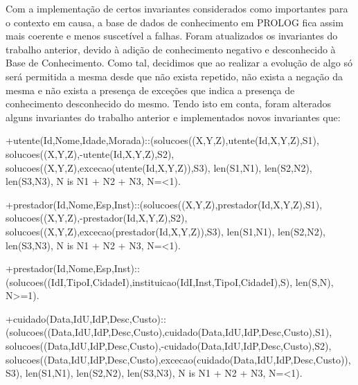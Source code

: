 \documentclass{article}
\begin{document}
Com a implementação de certos invariantes considerados como importantes para o contexto em causa, a base de dados de conhecimento em PROLOG fica assim mais coerente e menos suscetível a falhas. Foram atualizados os invariantes do trabalho anterior, devido à adição de conhecimento negativo e desconhecido à Base de Conhecimento. Como tal, decidimos que ao realizar a evolução de algo só será permitida a mesma desde que não exista repetido, não exista a negação da mesma e não exista a presença de exceções que indica a presença de conhecimento desconhecido do mesmo.
Tendo isto em conta, foram alterados alguns invariantes do trabalho anterior e implementados novos invariantes que:
\begin{spverbatim}
+utente(Id,Nome,Idade,Morada)::(solucoes((X,Y,Z),utente(Id,X,Y,Z),S1),
                                solucoes((X,Y,Z),-utente(Id,X,Y,Z),S2),
                                solucoes((X,Y,Z),excecao(utente(Id,X,Y,Z)),S3),
                                len(S1,N1),
                                len(S2,N2),
                                len(S3,N3),
                                N is N1 + N2 + N3,
                                N=<1).

+prestador(Id,Nome,Esp,Inst)::(solucoes((X,Y,Z),prestador(Id,X,Y,Z),S1),
                               solucoes((X,Y,Z),-prestador(Id,X,Y,Z),S2),
                               solucoes((X,Y,Z),excecao(prestador(Id,X,Y,Z)),S3),
                               len(S1,N1),
                               len(S2,N2),
                               len(S3,N3),
                               N is N1 + N2 + N3,
                               N=<1).

+prestador(Id,Nome,Esp,Inst)::
            (solucoes((IdI,TipoI,CidadeI),instituicao(IdI,Inst,TipoI,CidadeI),S),
            len(S,N),
            N>=1).

+cuidado(Data,IdU,IdP,Desc,Custo)::
        (solucoes((Data,IdU,IdP,Desc,Custo),cuidado(Data,IdU,IdP,Desc,Custo),S1),
        solucoes((Data,IdU,IdP,Desc,Custo),-cuidado(Data,IdU,IdP,Desc,Custo),S2),
        solucoes((Data,IdU,IdP,Desc,Custo),excecao(cuidado(Data,IdU,IdP,Desc,Custo)),S3),
        len(S1,N1),
        len(S2,N2),
        len(S3,N3),
        N is N1 + N2 + N3,
        N=<1).


\end{spverbatim}
\end{document}

